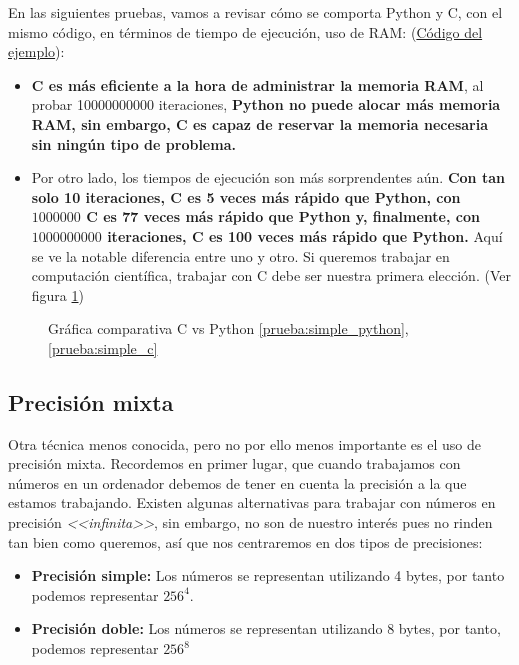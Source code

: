 En las siguientes pruebas, vamos a revisar cómo se comporta Python y C, con el mismo código, en términos de tiempo de ejecución, uso de RAM: (\hyperref[prueba:cvspython]{Código del ejemplo}):

\begin{itemize}
\item \textbf{C es más eficiente a la hora de administrar la memoria RAM}, al probar 10000000000 iteraciones, \textbf{Python no puede alocar más memoria RAM, sin embargo, C es capaz de reservar la memoria necesaria sin ningún tipo de problema.}
  
\item Por otro lado, los tiempos de ejecución son más sorprendentes aún. \textbf{Con tan solo 10 iteraciones, C es 5 veces más rápido que Python, con $1000000$ C es 77 veces más rápido que Python y, finalmente, con $1000000000$ iteraciones, C es 100 veces más rápido que Python.} Aquí se ve la notable diferencia entre uno y otro. Si queremos trabajar en computación científica, trabajar con C debe ser nuestra primera elección. (Ver figura \ref{fig:cvspython})
\end{itemize}

\begin{figure}[h]
  \centering
  \caption{Gráfica comparativa C vs Python \ref{prueba:simple_python}, \ref{prueba:simple_c}}
  \label{fig:cvspython}
\end{figure}

\subsection{Precisión mixta}
Otra técnica menos conocida, pero no por ello menos importante es el uso de precisión mixta. Recordemos en primer lugar, que cuando trabajamos con números en un ordenador debemos de tener en cuenta la precisión a la que estamos trabajando. Existen algunas alternativas para trabajar con números en precisión \textit{<<infinita>>}, sin embargo, no son de nuestro interés pues no rinden tan bien como queremos, así que nos centraremos en dos tipos de precisiones:

\begin{itemize}
\item \textbf{Precisión simple: } Los números se representan utilizando 4 bytes, por tanto podemos representar $256^4$.
  
\item \textbf{Precisión doble: } Los números se representan utilizando 8 bytes, por tanto, podemos representar $256^8$
\end{itemize}

